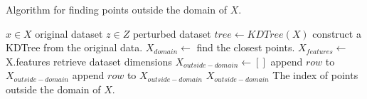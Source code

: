 \begin{algorithm}[H]
  \caption{Algorithm for finding points outside the domain of $X$.}
  \begin{algorithmic}
    \Require $x \in X$  \Comment original dataset
    \Require $z \in Z$ \Comment perturbed dataset
    \State $tree \gets KDTree(X)$ \Comment construct a KDTree from the original data.
    \State $X_{domain} \gets$  \Comment find the closest points.
    \State $X_{features} \gets$ X.features \Comment retrieve dataset dimensions
    \State $X_{outside-domain} \gets []$
          \State append $row$ to $X_{outside-domain}$
        \EndIf
          \State append $row$ to $X_{outside-domain}$
        \EndIf
      \EndFor
    \EndFor
    \State \Return $X_{outside-domain}$ \Comment The index of points outside the domain of $X$.
  \end{algorithmic}
  \label{alg:find-outside-domain-laplace}
\end{algorithm}